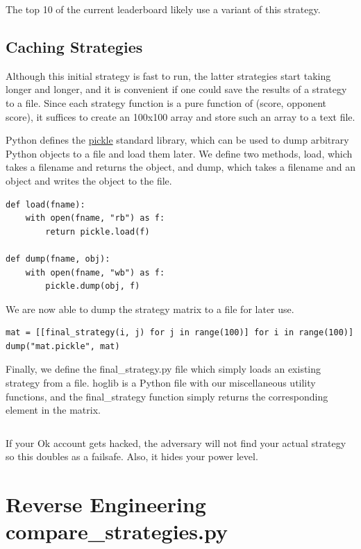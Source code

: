 \documentclass[11pt, oneside]{article}
\begin{document}
The top 10 of the current leaderboard likely use a variant of this strategy. 

\newpage

\subsection{Caching Strategies}

Although this initial strategy is fast to run, the latter strategies 
start taking longer and longer, and it is convenient if one could save
the results of a strategy to a file.
Since each strategy function is a pure function of (score, opponent score),
it suffices to create an 100x100 array and store such an array to a text file.

Python defines the \href{https://docs.python.org/3/library/pickle.html}{pickle}
standard library, which can be used to dump arbitrary Python objects to a file
and load them later. We define two methods, 
load, which takes a filename and returns the object,
and dump, which takes a filename and an object and writes the object to the file.

\begin{verbatim}
def load(fname):
    with open(fname, "rb") as f:
        return pickle.load(f)

def dump(fname, obj):
    with open(fname, "wb") as f:
        pickle.dump(obj, f)
\end{verbatim} 

We are now able to dump the strategy matrix to a file for later use.
\begin{verbatim}
mat = [[final_strategy(i, j) for j in range(100)] for i in range(100)]
dump("mat.pickle", mat)
\end{verbatim} 

Finally, we define the final\_strategy.py file which simply loads
an existing strategy from a file. hoglib is a Python file with 
our miscellaneous utility functions, and the final\_strategy function
simply returns the corresponding element in the matrix.
\inputminted[linenos=true, fontsize=\footnotesize, label=final\_strategy.py]{Python}{programs/final_strategy.py}

If your Ok account gets hacked, the adversary will not find your actual strategy
so this doubles as a failsafe.
Also, it hides your power level.

\section{Reverse Engineering compare\_strategies.py}
\end{document}
